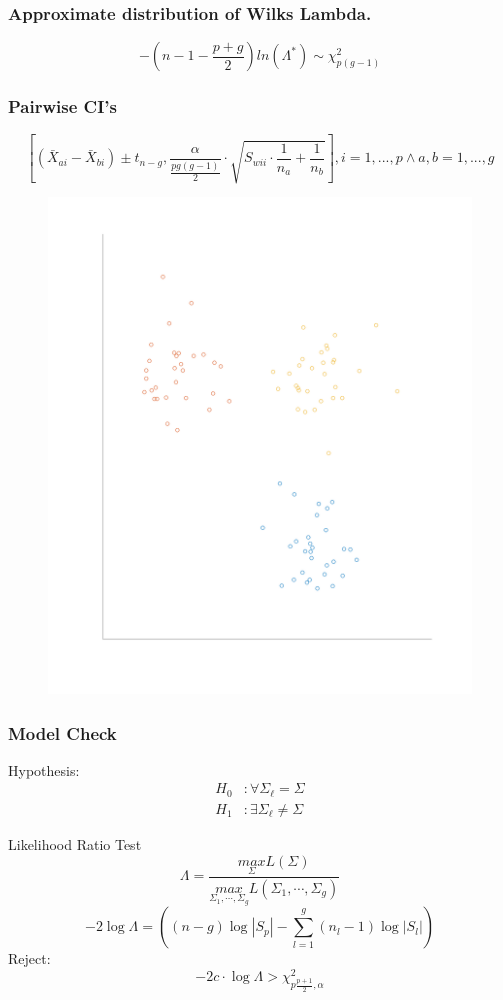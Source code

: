\documentclass[aspectratio=169,10pt,t]{beamer}
\begin{document}
\begin{frame}[t]
    \frametitle{Approximate distribution of Wilks Lambda.}
    \[
        -\left(n-1-\frac{p+g}{2}\right)ln\left( \Lambda^*\right) \sim \chi^2_{p(g-1)}
    \]  
\end{frame}

\begin{frame}[t]
    \frametitle{Pairwise CI's}
    \[
        \left[(\bar{X}_{ai} - \bar{X}_{bi}) \pm t_{n-g}, \frac{\alpha}{ \frac{pg(g-1)}{2}} \cdot \sqrt{S_{wii} \cdot \frac{1}{n_a} + \frac{1}{n_b} } \right] , i = 1,...,p \land a,b = 1,...,g
    \] 
\begin{figure}[H]
    \includegraphics[scale=0.2]{clusters.png}
\end{figure}
\end{frame}


\begin{frame}[t]
	\frametitle{Model Check}
    Hypothesis:
	\[
		\begin{aligned}
			H_0 &: \forall \Sigma_\ell = \Sigma\\
			H_1 &: \exists \Sigma_\ell \neq \Sigma
		\end{aligned}
	\] 
    
    Likelihood Ratio Test
\[
\Lambda = \frac{\underset{\Sigma}{max}L(\Sigma)}{\underset{\Sigma_1,\cdots,\Sigma_g}{max}L(\Sigma_1,\cdots,\Sigma_g)}  
\] 
    \[
        -2\log\Lambda =  \left((n-g)\log|S_p| - \sum^{g}_{l=1}(n_l - 1) \log|S_l| \right)  
    \]
    Reject:
    \[
        -2c \cdot \log\Lambda > \chi^2_{p \frac{p+1}{2}, \alpha}

    \] 

\end{frame}
\end{document}
